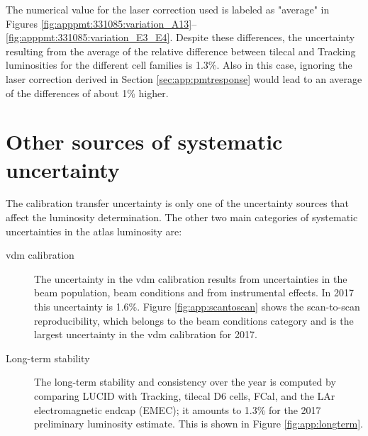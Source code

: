 \noindent The numerical value for the laser correction used is labeled as "average" in Figures \ref{fig:apppmt:331085:variation_A13}--\ref{fig:apppmt:331085:variation_E3_E4}. 
Despite these differences, the uncertainty resulting from the average of the relative difference between 
\gls{tilecal} and Tracking luminosities for the different cell families is 1.3\%. Also in this case, ignoring the laser correction derived in 
Section \ref{sec:app:pmtresponse} would lead to an average of the differences of about 1\% higher. 

\FloatBarrier

\section{Other sources of systematic uncertainty}

The calibration transfer uncertainty is only one of the uncertainty sources that affect the luminosity determination. 
The other two main categories of systematic uncertainties in the \gls{atlas} luminosity are:
\begin{description}
\item[\gls{vdm} calibration] The uncertainty in the \gls{vdm} calibration results from uncertainties in the 
beam population, beam conditions and from instrumental effects. In 2017 this uncertainty is 1.6\%. 
Figure \ref{fig:app:scantoscan} shows the scan-to-scan reproducibility, which belongs to the beam conditions category 
and is the largest uncertainty in the \gls{vdm} calibration for 2017.   
\item[Long-term stability] The long-term stability and consistency over the year is computed by comparing LUCID with
 Tracking, \gls{tilecal} D6 cells, FCal, and the LAr electromagnetic endcap (EMEC); 
 it amounts to 1.3\% for the 2017 preliminary 
luminosity estimate. This is shown in Figure \ref{fig:app:longterm}.
\end{description}

